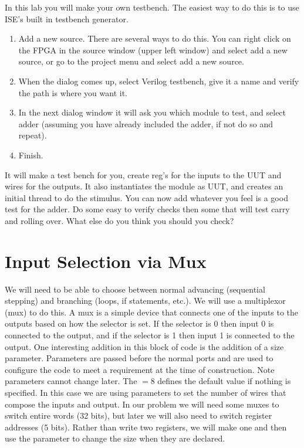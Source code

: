 
In this lab you will make your own testbench.  The easiest way to do this is to use ISE's built in testbench generator.  
\begin{enumerate}
\item Add a new source.  There are several ways to do this.  You can right click on the FPGA in the source window (upper left window) and select add a new source, or go to the project menu and select add a new source.
\item When the dialog comes up, select Verilog testbench, give it a name and verify the path is where you want it.
\item In the next dialog window it will ask you which module to test, and select adder (assuming you have already included the adder, if not do so and repeat).
\item Finish.
\end{enumerate}
It will make a test bench for you, create reg's for the inputs to the UUT and wires for the outputs.  It also instantiates the module as UUT, and creates an initial thread to do the stimulus.  You can now add whatever you feel is a good test for the adder. Do some easy to verify checks then some that will test carry and rolling over.  What else do you think you should you check?

\section{Input Selection via Mux}

We will need to be able to choose between normal advancing (sequential stepping) and branching (loops, if statements, etc.).  We will use a multiplexor (mux) to do this.  A mux is a simple device that connects one of the inputs to the outputs based on how the selector is set.  If the selector is 0 then input 0 is connected to the output, and if the selector is 1 then input 1 is connected to the output.  One interesting addition in this block of code is the addition of a size parameter.  Parameters are passed before the normal ports and are used to configure the code to meet a requirement at the time of construction.  Note parameters cannot change later.  The $=8$ defines the default value if nothing is specified.  In this case we are using parameters to set the number of wires that compose the inputs and output.  In our problem we will need some muxes to switch entire words (32 bits), but later we will also need to switch register addresses (5 bits).  Rather than write two registers, we will make one and then use the parameter to change the size when they are declared.

